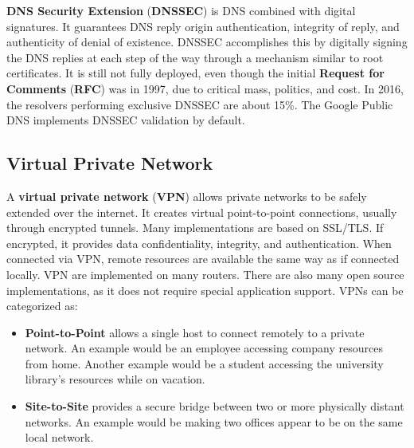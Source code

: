 \documentclass[11pt]{article}
\theoremstyle{plain} %
\theoremstyle{definition}
\theoremstyle{example}
\theoremstyle{remark}
\begin{document}
\textbf{DNS Security Extension} (\textbf{DNSSEC}) is DNS combined with digital signatures. It guarantees DNS reply origin authentication, integrity of reply, and authenticity of denial of existence. DNSSEC accomplishes this by digitally signing the DNS replies at each step of the way through a mechanism similar to root certificates. It is still not fully deployed, even though the initial \textbf{Request for Comments} (\textbf{RFC}) was in 1997, due to critical mass, politics, and cost. In 2016, the resolvers performing exclusive DNSSEC are about 15\%. The Google Public DNS implements DNSSEC validation by default. 

\subsection{Virtual Private Network}

A \textbf{virtual private network} (\textbf{VPN}) allows private networks to be safely extended over the internet. It creates virtual point-to-point connections, usually through encrypted tunnels. Many implementations are based on SSL/TLS. If encrypted, it provides data confidentiality, integrity, and authentication.
When connected via VPN, remote resources are available the same way as if connected locally. VPN are implemented on many routers. There are also many open source implementations, as it does not require special application support. 
VPNs can be categorized as:
\begin{itemize}
	\item \textbf{Point-to-Point} allows a single host to connect remotely to a private network. An example would be an employee accessing company resources from home. Another example would be a student accessing the university library's resources while on vacation. 
	\item \textbf{Site-to-Site} provides a secure bridge between two or more physically distant networks. An example would be making two offices appear to be on the same local network. 
\end{itemize}
\end{document}
